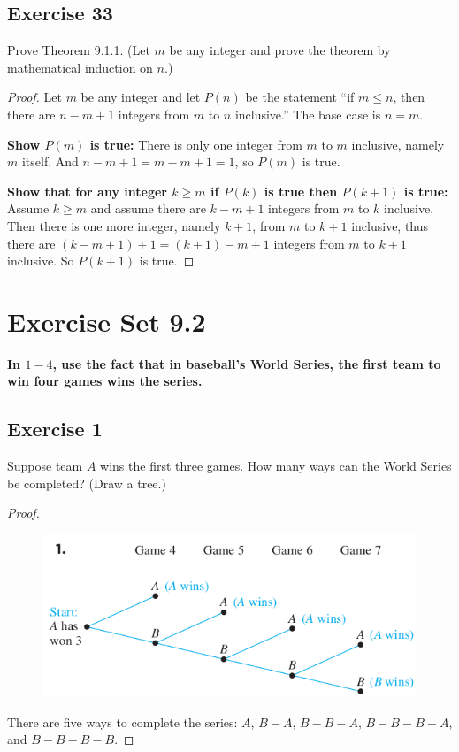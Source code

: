 \documentclass[14pt]{extarticle}
\newcommand{\cy}{\color{cyan}}
\begin{document}
\subsection{Exercise 33}
Prove Theorem 9.1.1. (Let $m$ be any integer and prove the theorem by mathematical induction on $n$.)

\begin{proof}
Let $m$ be any integer and let \(P(n)\) be the statement ``if \(m \leq n\), then there are \(n - m + 1\) integers 
from $m$ to $n$ inclusive.'' The base case is \(n=m\).

{\bf Show $P(m)$ is true:} There is only one integer from $m$ to $m$ inclusive, namely $m$ itself. And \(n - m + 1
 = m - m + 1 = 1\), so $P(m)$ is true.

{\bf Show that for any integer \(k \geq m\) if \(P(k)\) is true then \(P(k+1)\) is true:} Assume \(k \geq m\) and
assume there are \(k-m+1\) integers from $m$ to $k$ inclusive. Then there is one more integer, namely \(k+1\),
from $m$ to $k+1$ inclusive, thus there are \((k-m+1)+1 = (k+1)-m+1\) integers from $m$ to $k+1$ inclusive. So 
\(P(k+1)\) is true.
\end{proof}

\section{Exercise Set 9.2}
{\bf \cy In $1-4$, use the fact that in baseball’s World Series, the first team to win four games wins the series.}

\subsection{Exercise 1}
Suppose team $A$ wins the first three games. How many ways can the World Series be completed? (Draw a tree.)

\begin{proof}
\begin{figure}[ht!]
\centering
\includegraphics[scale=0.43]{../images/9.2.1.png}
\end{figure}

There are five ways to complete the series: $A$, \(B-A\), \(B-B-A\), \(B-B-B-A\), and \(B-B-B-B\).
\end{proof}
\end{document}
